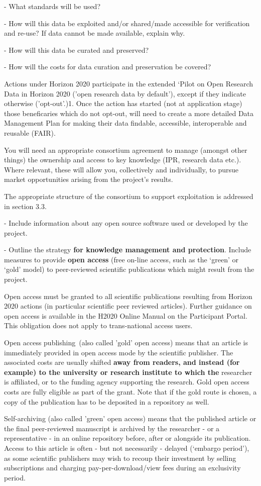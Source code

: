 \begin{todo}{}
    - What standards will be used?
    
    - How will this data be exploited and/or shared/made accessible for verification and re-use? If data cannot be made available, explain why.
    
    - How will this data be curated and preserved?
    
    - How will the costs for data curation and preservation be covered?

Actions under Horizon 2020 participate in the extended ‘Pilot on Open Research Data in Horizon 2020 ('open research data by default'), except if they indicate otherwise ('opt-out'.)1. Once the action has started (not at application stage) those beneficaries which do not opt-out, will need to create a more detailed Data Management Plan for making their data findable, accessible, interoperable and reusable (FAIR).

You will need an appropriate consortium agreement to manage (amongst other things) the ownership and access to key knowledge (IPR, research data etc.). Where relevant, these will allow you, collectively and individually, to pursue market opportunities arising from the project's results.

The appropriate structure of the consortium to support exploitation is addressed in section 3.3.

    - Include information about any open source software used or developed by the project.

    - Outline the strategy {\bf for knowledge management and protection}. Include measures to provide {\bf open access} (free on-line access, such as the ‘green’ or ‘gold’ model) to peer-reviewed scientific publications which might result from the project.

    Open access must be granted to all scientific publications resulting from Horizon 2020 actions (in particular scientific peer reviewed articles). Further guidance on open access is available in the H2020 Online Manual on the Participant Portal. This obligation does not apply to trans-national access users.

    Open access publishing (also called 'gold' open access) means that an article is immediately provided in open access mode by the scientific publisher. The associated costs are usually shifted {\bf away from readers, and instead (for example) to the university or research institute to which the} researcher is affiliated, or to the funding agency supporting the research. Gold open access costs are fully eligible as part of the grant. Note that if the gold route is chosen, a copy of the publication has to be deposited in a repository as well.

    Self-archiving (also called 'green' open access) means that the published article or the final peer-reviewed manuscript is archived by the researcher - or a representative - in an online repository before, after or alongside its publication. Access to this article is often - but not necessarily - delayed (‘embargo period’), as some scientific publishers may wish to recoup their investment by selling subscriptions and charging pay-per-download/view fees during an exclusivity period.
\end{todo}

